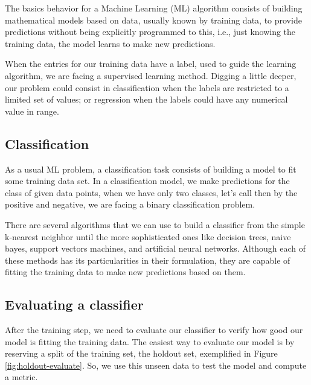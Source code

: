 	The basics behavior for a Machine Learning (ML) algorithm consists of building mathematical models based on data, usually known by training data, to provide predictions without being explicitly programmed to this, i.e., just knowing the training data, the model learns to make new predictions. 
	
	When the entries for our training data have a label, used to guide the learning algorithm, we are facing a supervised learning method. Digging a little deeper, our problem could consist in classification when the labels are restricted to a limited set of values; or regression when the labels could have any numerical value in range. 
		
	\subsection{Classification}
	
	As a usual ML problem, a classification task consists of building a model to fit some training data set. In a classification model, we make predictions for the class of given data points, when we have only two classes, let's call then by the positive and negative, we are facing a binary classification problem.
	
	There are several algorithms that we can use to build a classifier from the simple k-nearest neighbor until the more sophisticated ones like decision trees, naive bayes, support vectors machines, and artificial neural networks. Although each of these methods has its particularities in their formulation, they are capable of fitting the training data to make new predictions based on them.
	
	
		
	\subsection{Evaluating a classifier}
	
	After the training step, we need to evaluate our classifier to verify how good our model is fitting the training data. The easiest way to evaluate our model is by reserving a split of the training set, the holdout set, exemplified in Figure \ref{fig:holdout-evaluate}. So, we use this unseen data to test the model and compute a metric.
	
